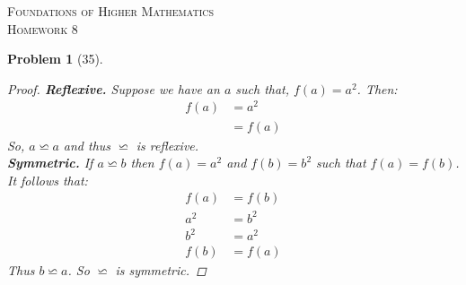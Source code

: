 \documentclass{article}
\theoremstyle{problem}
\newtheorem{prob}{Problem}
\theoremstyle{plain}
\theoremstyle{remark}
\begin{document}
\begin{center}
\textsc{\Large Foundations of Higher Mathematics}\\[.3cm]
\textsc{\Large Homework 8}
\end{center}

\begin{prob}[35]\ \\[-1cm]
  \begin{proof}
    \textbf{Reflexive.} Suppose we have an $a$ such that, $f(a) = a^2$. Then: 
    \begin{align*}
      f(a) &= a^2\\
      &= f(a)
    \end{align*}
    So, $a \backsimeq a$ and thus $\backsimeq$ is reflexive.\\
    \textbf{Symmetric.} If $a \backsimeq b$ then $f(a) = a^2$ and $f(b) = b^2$ such that $f(a) = f(b)$. It follows that:    
    \begin{align*}
      f(a) &= f(b)\\
      a^2 &= b^2\\
      b^2 &= a^2\\
      f(b) &= f(a)
    \end{align*}
    Thus $b \backsimeq a$. So $\backsimeq$ is symmetric.
  \end{proof}
\end{prob}
\end{document}
